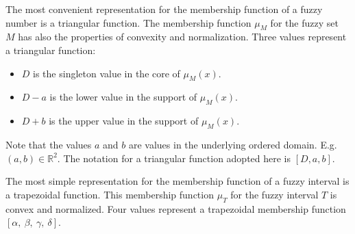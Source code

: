 \documentclass[twoside,twocolumn,a4paper]{article}
\begin{document}
The most convenient representation for the membership function of a fuzzy number is a triangular function. The membership function $\mu_M$ for the fuzzy set $M$ has also the properties of convexity and normalization. Three values represent a triangular function: 
\begin{itemize}
\item
$D$ is the singleton value in the core of $\mu_M(x)$.
\item
$D-a$ is the lower value in the support of $\mu_M(x)$. 
\item
$D+b$ is the upper value in the support of $\mu_M(x)$.
\end{itemize}
Note that the values $a$ and $b$ are values in the underlying ordered domain. E.g. $(a,b) \in \mathbb{R}^2$. The notation for a triangular function adopted here is $[D,a,b]$.

The most simple representation for the membership function of a fuzzy interval is a trapezoidal function. This membership function $\mu_T$ for the fuzzy interval $T$ is convex and normalized. Four values represent a trapezoidal membership function %
 $\left[\alpha,\ \beta,\ \gamma,\ \delta\right]$. 
 
\end{document}
